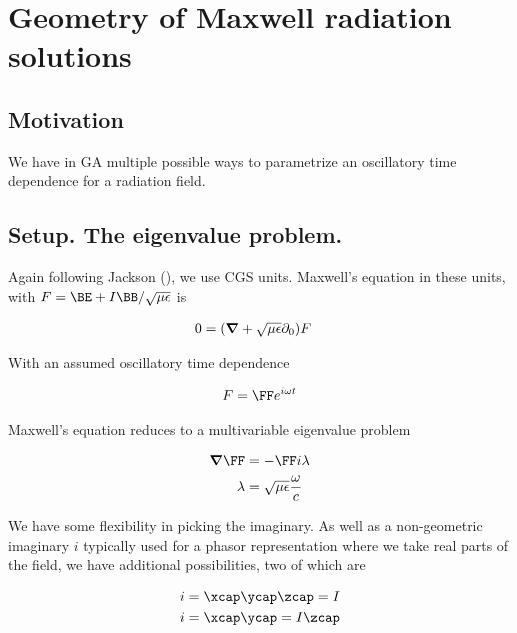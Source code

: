 

\chapter{Geometry of Maxwell radiation solutions}
\label{chap:radiationGeometry}
{}
\date{Aug 14, 2009}

\beginArtWithToc

\section{Motivation}

We have in GA multiple possible ways to parametrize an oscillatory time dependence for a radiation field.  
\section{Setup.  The eigenvalue problem.}

Again following Jackson (\cite{jackson1975cew}), we use CGS units.  Maxwell's equation in these units, with $F = \BE + I\BB/\sqrt{\mu\epsilon}$ is

\begin{align}\label{eqn:foo1}
0 &= (\boldsymbol{\nabla} + \sqrt{\mu\epsilon} \partial_0) F 
\end{align}

With an assumed oscillatory time dependence 

\begin{align}\label{eqn:foo2}
F = 
\FF 
e^{i\omega t}
\end{align}

Maxwell's equation reduces to a multivariable eigenvalue problem

\begin{align}\label{eqn:foo3}
\spacegrad \FF &= - \FF i \lambda \\
\lambda &= \sqrt{\mu\epsilon} \frac{\omega}{c} 
\end{align}

We have some flexibility in picking the imaginary.  As well as a non-geometric imaginary $i$ typically used for a phasor representation where we take real parts of the field, we have additional possibilities, two of which are

\begin{align}\label{eqn:foo4}
i &= \xcap\ycap\zcap = I \\
i &= \xcap \ycap = I \zcap
\end{align}

